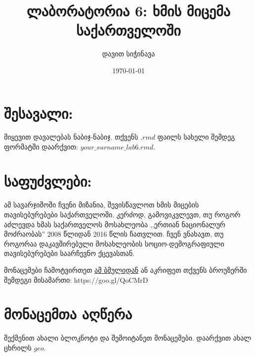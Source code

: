 \documentclass{article}\usepackage[]{graphicx}\usepackage[]{color}
\title{ლაბორატორია 6: ხმის მიცემა საქართველოში}
\author{დავით სიჭინავა}
\date{\today}
\begin{document}
\maketitle

\section*{შესავალი:}

\paragraph{}
მიყევით დავალებას ნაბიჯ-ნაბიჯ. თქვენს $.rmd$ ფაილს სახელი შემდეგ ფორმატში დაარქვით: $your\_surname\_lab6.rmd$. 

\section*{საფუძვლები:}
\paragraph{}

ამ სავარჯიშოში ჩვენი მიზანია, შევისწავლოთ ხმის მიცების თავისებურებები საქართველოში. კერძოდ, გამოვიკვლევთ, თუ როგორ აძლევდა ხმას საქართველოს მოსახლეობა ,,ერთიან ნაციონალურ მოძრაობას'' 2008 წლიდან 2016 წლის ჩათვლით. ჩვენ ვნახავთ, თუ როგორაა დაკავშირებული მოსახლეობის სოციო-დემოგრაფიული თავისებურებები საარჩევნო ქცევასთან.

მონაცემები ჩამოტვირთეთ  \href{https://goo.gl/QoCMrD}{ამ ბმულიდან} ან აკრიფეთ თქვენს ბროუზერში შემდეგი მისამართი: https://goo.gl/QoCMrD

\section*{მონაცემთა აღწერა}
\paragraph{}

შექმენით ახალი ბლოკნოტი და შემოიტანეთ მონაცემები. დაარქვით ახალ ცხრილს $geo$.
\end{document}

